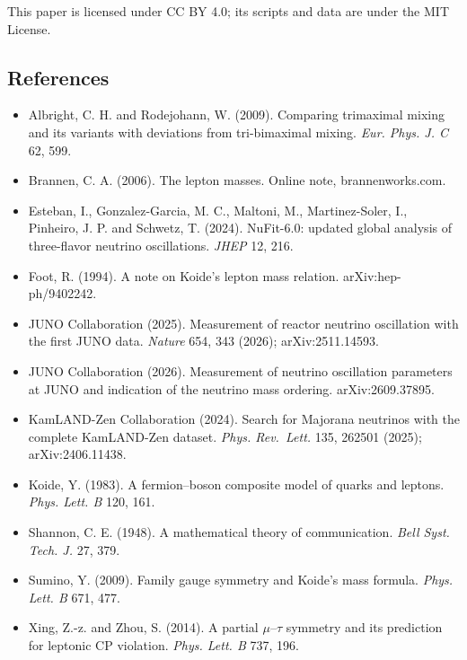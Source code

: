 \documentclass[
]{article}
\providecommand{\tightlist}{%
  \setlength{\itemsep}{0pt}\setlength{\parskip}{0pt}}
\begin{document}
This paper is licensed under CC BY 4.0; its scripts and data are under
the MIT License.

\hypertarget{references}{%
\subsection{References}\label{references}}

\begin{itemize}
\tightlist
\item
  Albright, C. H. and Rodejohann, W. (2009). Comparing trimaximal mixing
  and its variants with deviations from tri-bimaximal mixing. \emph{Eur.
  Phys. J. C} 62, 599.
\item
  Brannen, C. A. (2006). The lepton masses. Online note,
  brannenworks.com.
\item
  Esteban, I., Gonzalez-Garcia, M. C., Maltoni, M., Martinez-Soler, I.,
  Pinheiro, J. P. and Schwetz, T. (2024). NuFit-6.0: updated global
  analysis of three-flavor neutrino oscillations. \emph{JHEP} 12, 216.
\item
  Foot, R. (1994). A note on Koide's lepton mass relation.
  arXiv:hep-ph/9402242.
\item
  JUNO Collaboration (2025). Measurement of reactor neutrino oscillation
  with the first JUNO data. \emph{Nature} 654, 343 (2026);
  arXiv:2511.14593.
\item
  JUNO Collaboration (2026). Measurement of neutrino oscillation
  parameters at JUNO and indication of the neutrino mass ordering.
  arXiv:2609.37895.
\item
  KamLAND-Zen Collaboration (2024). Search for Majorana neutrinos with
  the complete KamLAND-Zen dataset. \emph{Phys. Rev.~Lett.} 135, 262501
  (2025); arXiv:2406.11438.
\item
  Koide, Y. (1983). A fermion--boson composite model of quarks and
  leptons. \emph{Phys. Lett. B} 120, 161.
\item
  Shannon, C. E. (1948). A mathematical theory of communication.
  \emph{Bell Syst. Tech. J.} 27, 379.
\item
  Sumino, Y. (2009). Family gauge symmetry and Koide's mass formula.
  \emph{Phys. Lett. B} 671, 477.
\item
  Xing, Z.-z. and Zhou, S. (2014). A partial \ensuremath{\mu}--\ensuremath{\tau} symmetry and its
  prediction for leptonic CP violation. \emph{Phys. Lett. B} 737, 196.
\end{itemize}
\end{document}
